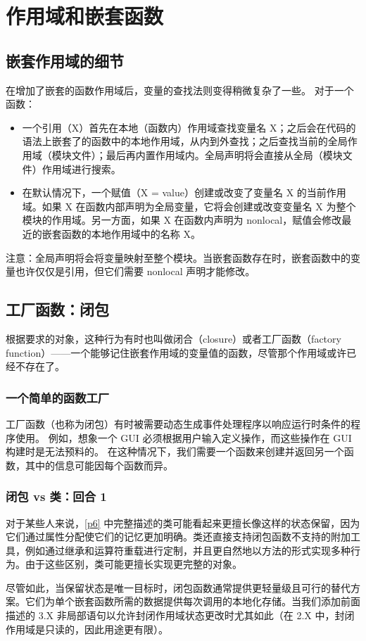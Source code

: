 \section{作用域和嵌套函数}
\subsection{嵌套作用域的细节}
在增加了嵌套的函数作用域后，变量的查找法则变得稍微复杂了一些。
对于一个函数：
\begin{itemize}
    \item 一个引用（X）首先在本地（函数内）作用域查找变量名 X；之后会在代码的语法上嵌套了的函数中的本地作用域，从内到外查找；之后查找当前的全局作用域（模块文件）；最后再内置作用域内。全局声明将会直接从全局（模块文件）作用域进行搜索。
    \item 在默认情况下，一个赋值（X = value）创建或改变了变量名 X 的当前作用域。如果 X 在函数内部声明为全局变量，它将会创建或改变变量名 X 为整个模块的作用域。另一方面，如果 X 在函数内声明为 nonlocal，赋值会修改最近的嵌套函数的本地作用域中的名称 X。
\end{itemize}
注意：全局声明将会将变量映射至整个模块。当嵌套函数存在时，嵌套函数中的变量也许仅仅是引用，但它们需要 nonlocal 声明才能修改。
\subsection{工厂函数：闭包}
根据要求的对象，这种行为有时也叫做闭合（closure）或者工厂函数（factory function）——一个能够记住嵌套作用域的变量值的函数，尽管那个作用域或许已经不存在了。
\subsubsection*{一个简单的函数工厂}
工厂函数（也称为闭包）有时被需要动态生成事件处理程序以响应运行时条件的程序使用。 例如，想象一个 GUI 必须根据用户输入定义操作，而这些操作在 GUI 构建时是无法预料的。 在这种情况下，我们需要一个函数来创建并返回另一个函数，其中的信息可能因每个函数而异。
\subsubsection*{闭包 vs 类：回合 1}
对于某些人来说，\autoref{p6} 中完整描述的类可能看起来更擅长像这样的状态保留，因为它们通过属性分配使它们的记忆更加明确。类还直接支持闭包函数不支持的附加工具，例如通过继承和运算符重载进行定制，并且更自然地以方法的形式实现多种行为。由于这些区别，类可能更擅长实现更完整的对象。

尽管如此，当保留状态是唯一目标时，闭包函数通常提供更轻量级且可行的替代方案。它们为单个嵌套函数所需的数据提供每次调用的本地化存储。当我们添加前面描述的 3.X 非局部语句以允许封闭作用域状态更改时尤其如此（在 2.X 中，封闭作用域是只读的，因此用途更有限）。

